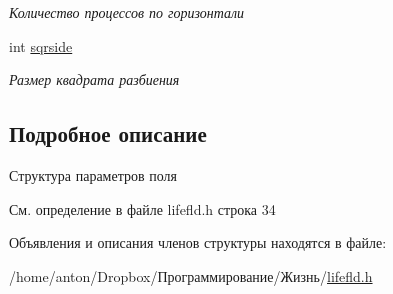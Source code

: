 \begin{DoxyCompactItemize}
\begin{DoxyCompactList}\small\item\em Количество процессов по горизонтали \end{DoxyCompactList}\item 
int \hyperlink{structfld__param_a325bd3268e1877cda2a01cc850b02409}{sqrside}\hypertarget{structfld__param_a325bd3268e1877cda2a01cc850b02409}{}\label{structfld__param_a325bd3268e1877cda2a01cc850b02409}

\begin{DoxyCompactList}\small\item\em Размер квадрата разбиения \end{DoxyCompactList}\end{DoxyCompactItemize}


\subsection{Подробное описание}
Структура параметров поля 

См. определение в файле lifefld.\+h строка 34



Объявления и описания членов структуры находятся в файле\+:\begin{DoxyCompactItemize}
\item 
/home/anton/\+Dropbox/Программирование/Жизнь/\hyperlink{lifefld_8h}{lifefld.\+h}\end{DoxyCompactItemize}
